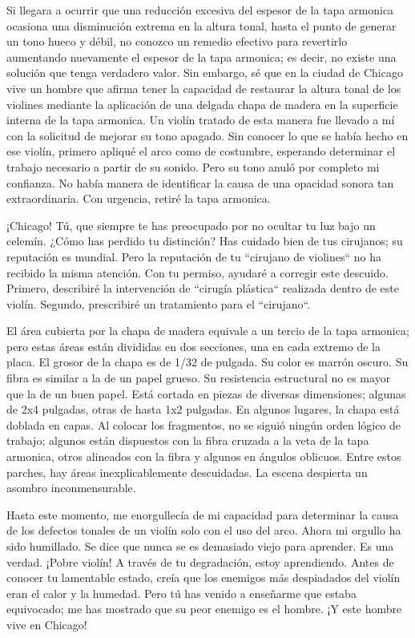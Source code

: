 \documentclass[12pt]{book}
\begin{document}
Si llegara a ocurrir que una reducción excesiva del espesor de la tapa armonica ocasiona una disminución extrema en la altura tonal, hasta el punto de generar un tono hueco y débil, no conozco un remedio efectivo para revertirlo aumentando nuevamente el espesor de la tapa armonica; es decir, no existe una solución que tenga verdadero valor. Sin embargo, sé que en la ciudad de Chicago vive un hombre que afirma tener la capacidad de restaurar la altura tonal de los violines mediante la aplicación de una delgada chapa de madera en la superficie interna de la tapa armonica. Un violín tratado de esta manera fue llevado a mí con la solicitud de mejorar su tono apagado. Sin conocer lo que se había hecho en ese violín, primero apliqué el arco como de costumbre, esperando determinar el trabajo necesario a partir de su sonido. Pero su tono anuló por completo mi confianza. No había manera de identificar la causa de una opacidad sonora tan extraordinaria. Con urgencia, retiré la tapa armonica.

¡Chicago! Tú, que siempre te has preocupado por no ocultar tu luz bajo un celemín. ¿Cómo has perdido tu distinción? Has cuidado bien de tus cirujanos; su reputación es mundial. Pero la reputación de tu ``cirujano de violines`` no ha recibido la misma atención. Con tu permiso, ayudaré a corregir este descuido. Primero, describiré la intervención de ``cirugía plástica`` realizada dentro de este violín. Segundo, prescribiré un tratamiento para el ``cirujano``.

El área cubierta por la chapa de madera equivale a un tercio de la tapa armonica; pero estas áreas están divididas en dos secciones, una en cada extremo de la placa. El grosor de la chapa es de 1/32 de pulgada. Su color es marrón oscuro. Su fibra es similar a la de un papel grueso. Su resistencia estructural no es mayor que la de un buen papel. Está cortada en piezas de diversas dimensiones; algunas de 2x4 pulgadas, otras de hasta 1x2 pulgadas. En algunos lugares, la chapa está doblada en capas. Al colocar los fragmentos, no se siguió ningún orden lógico de trabajo; algunos están dispuestos con la fibra cruzada a la veta de la tapa armonica, otros alineados con la fibra y algunos en ángulos oblicuos. Entre estos parches, hay áreas inexplicablemente descuidadas. La escena despierta un asombro inconmensurable.

Hasta este momento, me enorgullecía de mi capacidad para determinar la causa de los defectos tonales de un violín solo con el uso del arco. Ahora mi orgullo ha sido humillado. Se dice que nunca se es demasiado viejo para aprender. Es una verdad. ¡Pobre violín! A través de tu degradación, estoy aprendiendo. Antes de conocer tu lamentable estado, creía que los enemigos más despiadados del violín eran el calor y la humedad. Pero tú has venido a enseñarme que estaba equivocado; me has mostrado que su peor enemigo es el hombre. ¡Y este hombre vive en Chicago!
\end{document}
